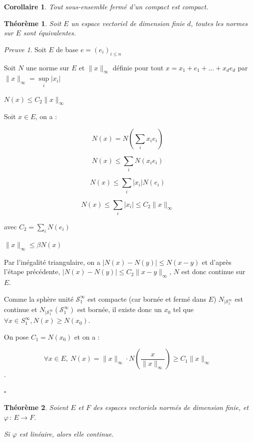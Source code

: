 \documentclass[]{article}
\newtheorem{mythm}{Théorème}
\newtheorem{mycor}{Corollaire}
\theoremstyle{remark}
\newtheorem{myproof}{Preuve}
\theoremstyle{definition}
\newcommand{\cqfd}{
	\hfill$\square$
}
\newcommand{\funcshort}[3]{
#1 \, : \, #2 \longrightarrow #3
}
\newenvironment{proofpart}[1]{
	\leavevmode
	
	\noindent
	{\textit{\textbf{\boldmath #1}}}
	
}{
	\checkmark
}
\begin{document}
\begin{mycor}
	Tout sous-ensemble fermé d'un compact est compact.
\end{mycor}

\begin{mythm}
	Soit $E$ un espace vectoriel de dimension finie $d$, toutes les normes sur $E$ sont équivalentes.
\end{mythm}

\begin{myproof}
	Soit $E$ de base $e=(e_i)_{i \leqslant n}$
	
	Soit $N$ une norme sur $E$ et $\|x\|_{\infty}$ définie pour tout $x=x_1 +e_1 + ... + x_d e_d$ par $\|x\|_{\infty} = \sup\limits_i |x_i|$
	
	\begin{proofpart}{$N(x) \leqslant C_2 \|x\|_\infty$}
		Soit $x \in E$, on a :
		
		$$N(x) = N\left(\sum_{i} x_i e_i\right)$$

		$$N(x) \leqslant \sum_{i} N(x_i e_i)$$

		$$N(x) \leqslant \sum_{i} |x_i| N(e_i)$$

		$$N(x) \leqslant \sum_{i} |x_i| \leqslant C_2 \|x\|_{\infty}$$
		
		avec $C_2 = \sum_i N(e_i)$
	\end{proofpart}
	
	\begin{proofpart}{$\|x\|_\infty \leqslant \beta N(x)$}
		Par l'inégalité triangulaire, on a $|N(x)-N(y)| \leqslant N(x-y)$ et d'après l'étape précédente, $|N(x) - N(y)| \leqslant C_2 \|x-y\|_{\infty}$, $N$ est donc continue sur $E$.
		
		Comme la sphère unité $\mathcal{S}_1^{\infty}$ est compacte (car bornée et fermé dans $E$) $N_{|\mathcal{S}_1^{\infty}}$ est continue et $N_{|\mathcal{S}_1^{\infty}}(\mathcal{S}_1^{\infty})$ est bornée, il existe donc un $x_0$ tel que $\forall x \in S^{\infty}_1, N(x) \geqslant N(x_0)$.
		
		On pose $C_1=N(x_0)$ et on a :
		
		$$\forall x \in E, ~ N(x) = \|x\|_{\infty} \cdot  N\left(\frac{x}{\|x\|_{\infty}}\right) \geqslant C_1 \|x\|_{\infty}$$.
	\end{proofpart}
	
	\cqfd
\end{myproof}

\begin{mythm}
	Soient $E$ et $F$ des espaces vectoriels normés de dimension finie, et $\funcshort{\varphi}{E}{F}$.
	
	Si $\varphi$ est linéaire, alors elle continue.
\end{mythm}
\end{document}

